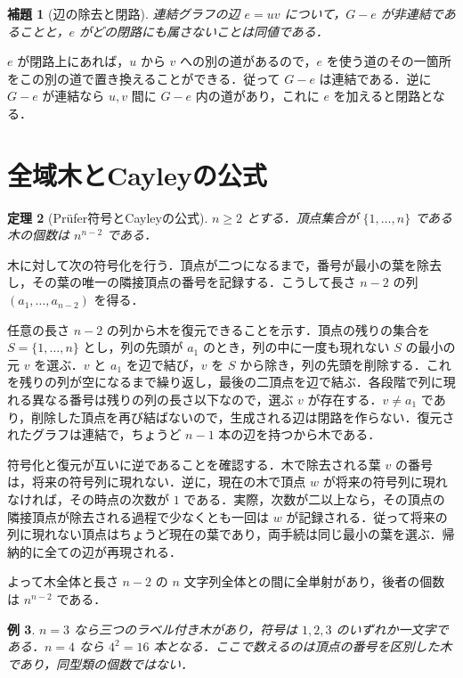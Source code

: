 \documentclass[a5paper,10pt,onecolumn]{jsarticle}
\makeatletter
\theoremstyle{mathnotetheorem}
\newtheorem{theorem}{定理}[section]
\newtheorem{lemma}[theorem]{補題}
\newtheorem{example}[theorem]{例}
\renewcommand{\proofname}{証明}
\renewenvironment{proof}[1][\proofname]{%
  \par\pushQED{\qed}\normalfont\topsep4\p@\@plus2\p@\relax
  \trivlist\item[\hskip\labelsep\bfseries #1]\ignorespaces
}{\popQED\endtrivlist\@endpefalse}
\makeatother
\begin{document}
\begin{lemma}[辺の除去と閉路]\label{lem:bridge}
連結グラフの辺 $e=uv$ について，$G-e$ が非連結であることと，$e$ がどの閉路にも属さないことは同値である．
\end{lemma}
\begin{proof}
$e$ が閉路上にあれば，$u$ から $v$ への別の道があるので，$e$ を使う道のその一箇所をこの別の道で置き換えることができる．従って $G-e$ は連結である．逆に $G-e$ が連結なら $u,v$ 間に $G-e$ 内の道があり，これに $e$ を加えると閉路となる．
\end{proof}

\section{全域木とCayleyの公式}
\begin{theorem}[Pr\"ufer符号とCayleyの公式]\label{thm:cayley}
$n\ge2$ とする．頂点集合が $\{1,\dots,n\}$ である木の個数は $n^{n-2}$ である．
\end{theorem}
\begin{proof}
木に対して次の符号化を行う．頂点が二つになるまで，番号が最小の葉を除去し，その葉の唯一の隣接頂点の番号を記録する．こうして長さ $n-2$ の列 $(a_1,\dots,a_{n-2})$ を得る．

任意の長さ $n-2$ の列から木を復元できることを示す．頂点の残りの集合を $S=\{1,\dots,n\}$ とし，列の先頭が $a_1$ のとき，列の中に一度も現れない $S$ の最小の元 $v$ を選ぶ．$v$ と $a_1$ を辺で結び，$v$ を $S$ から除き，列の先頭を削除する．これを残りの列が空になるまで繰り返し，最後の二頂点を辺で結ぶ．各段階で列に現れる異なる番号は残りの列の長さ以下なので，選ぶ $v$ が存在する．$v\ne a_1$ であり，削除した頂点を再び結ばないので，生成される辺は閉路を作らない．復元されたグラフは連結で，ちょうど $n-1$ 本の辺を持つから木である．

符号化と復元が互いに逆であることを確認する．木で除去される葉 $v$ の番号は，将来の符号列に現れない．逆に，現在の木で頂点 $w$ が将来の符号列に現れなければ，その時点の次数が $1$ である．実際，次数が二以上なら，その頂点の隣接頂点が除去される過程で少なくとも一回は $w$ が記録される．従って将来の列に現れない頂点はちょうど現在の葉であり，両手続は同じ最小の葉を選ぶ．帰納的に全ての辺が再現される．

よって木全体と長さ $n-2$ の $n$ 文字列全体との間に全単射があり，後者の個数は $n^{n-2}$ である．
\end{proof}

\begin{example}
$n=3$ なら三つのラベル付き木があり，符号は $1,2,3$ のいずれか一文字である．$n=4$ なら $4^2=16$ 本となる．ここで数えるのは頂点の番号を区別した木であり，同型類の個数ではない．
\end{example}
\end{document}
